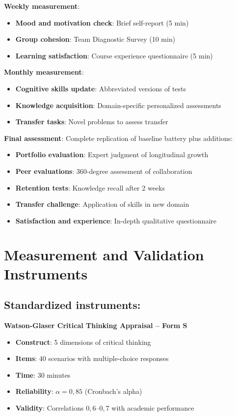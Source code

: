 \textbf{Weekly measurement}:
\begin{itemize}
    \item \textbf{Mood and motivation check}: Brief self-report (5 min)
    \item \textbf{Group cohesion}: Team Diagnostic Survey \cite{Wageman1995} (10 min)
    \item \textbf{Learning satisfaction}: Course experience questionnaire (5 min)
\end{itemize}

\newpage

\textbf{Monthly measurement}:
\begin{itemize}
    \item \textbf{Cognitive skills update}: Abbreviated versions of tests
    \item \textbf{Knowledge acquisition}: Domain-specific personalized assessments
    \item \textbf{Transfer tasks}: Novel problems to assess transfer
\end{itemize}

\textbf{Final assessment}:
Complete replication of baseline battery plus additions:
\begin{itemize}
    \item \textbf{Portfolio evaluation}: Expert judgment of longitudinal growth
    \item \textbf{Peer evaluations}: 360-degree assessment of collaboration
    \item \textbf{Retention tests}: Knowledge recall after 2 weeks
    \item \textbf{Transfer challenge}: Application of skills in new domain
    \item \textbf{Satisfaction and experience}: In-depth qualitative questionnaire
\end{itemize}

\section{Measurement and Validation Instruments}
\subsection*{Standardized instruments:}

\textbf{Watson-Glaser Critical Thinking Appraisal -- Form S}
\begin{itemize}
	\item \textbf{Construct}: 5 dimensions of critical thinking
	\item \textbf{Items}: 40 scenarios with multiple-choice responses
	\item \textbf{Time}: 30 minutes
	\item \textbf{Reliability}: $\alpha = 0{,}85$ (Cronbach's alpha)
	\item \textbf{Validity}: Correlations $0{,}6$--$0{,}7$ with academic performance
\end{itemize}

